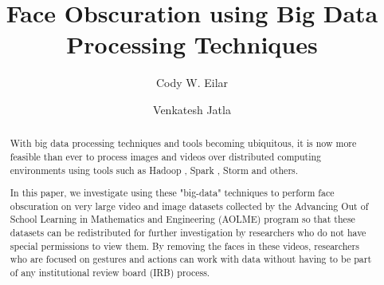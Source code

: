 \documentclass[
	submission,
	final,
	notitlepage,
	narroweqnarray,
	inline,
	twoside,
	]{ieee}
\begin{document}
\title{Face Obscuration using Big Data Processing Techniques}

\author[EILAR AND VENKATESH]{Cody W. Eilar
       \and{} Venkatesh Jatla 
}


\maketitle               

\begin{abstract} 
  With big data processing techniques and tools becoming ubiquitous, it
  is now more feasible than ever to process images and videos over 
  distributed computing environments using tools such as Hadoop \cite{hadoop}, Spark \cite{spark}, Storm \cite{storm} and others. 

  In this paper, we investigate 
  using these "big-data" techniques to perform face obscuration on very large
  video and image datasets collected by the Advancing Out of School Learning in 
  Mathematics and Engineering (AOLME) program so that these datasets can be redistributed for further
  investigation by researchers who do not have special permissions to view 
  them. By removing the faces in these videos, researchers who are focused
  on gestures and actions can work with data without having to be 
  part of any institutional review board (IRB) process.  
\end{abstract}
\end{document}
